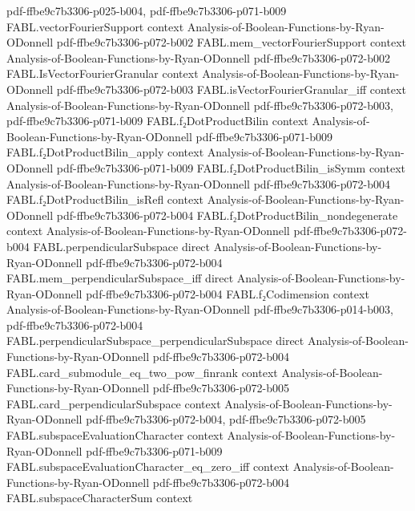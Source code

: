 \begin{theorem}
  {pdf-ffbe9c7b3306-p025-b004,
    pdf-ffbe9c7b3306-p071-b009}
\proofstep
  {FABL.vectorFourierSupport}
  {context}
  {Analysis-of-Boolean-Functions-by-Ryan-ODonnell}
  {pdf-ffbe9c7b3306-p072-b002}
\proofstep
  {FABL.mem_vectorFourierSupport}
  {context}
  {Analysis-of-Boolean-Functions-by-Ryan-ODonnell}
  {pdf-ffbe9c7b3306-p072-b002}
\proofstep
  {FABL.IsVectorFourierGranular}
  {context}
  {Analysis-of-Boolean-Functions-by-Ryan-ODonnell}
  {pdf-ffbe9c7b3306-p072-b003}
\proofstep
  {FABL.isVectorFourierGranular_iff}
  {context}
  {Analysis-of-Boolean-Functions-by-Ryan-ODonnell}
  {pdf-ffbe9c7b3306-p072-b003,
    pdf-ffbe9c7b3306-p071-b009}
\proofstep
  {FABL.f₂DotProductBilin}
  {context}
  {Analysis-of-Boolean-Functions-by-Ryan-ODonnell}
  {pdf-ffbe9c7b3306-p071-b009}
\proofstep
  {FABL.f₂DotProductBilin_apply}
  {context}
  {Analysis-of-Boolean-Functions-by-Ryan-ODonnell}
  {pdf-ffbe9c7b3306-p071-b009}
\proofstep
  {FABL.f₂DotProductBilin_isSymm}
  {context}
  {Analysis-of-Boolean-Functions-by-Ryan-ODonnell}
  {pdf-ffbe9c7b3306-p072-b004}
\proofstep
  {FABL.f₂DotProductBilin_isRefl}
  {context}
  {Analysis-of-Boolean-Functions-by-Ryan-ODonnell}
  {pdf-ffbe9c7b3306-p072-b004}
\proofstep
  {FABL.f₂DotProductBilin_nondegenerate}
  {context}
  {Analysis-of-Boolean-Functions-by-Ryan-ODonnell}
  {pdf-ffbe9c7b3306-p072-b004}
\proofstep
  {FABL.perpendicularSubspace}
  {direct}
  {Analysis-of-Boolean-Functions-by-Ryan-ODonnell}
  {pdf-ffbe9c7b3306-p072-b004}
\proofstep
  {FABL.mem_perpendicularSubspace_iff}
  {direct}
  {Analysis-of-Boolean-Functions-by-Ryan-ODonnell}
  {pdf-ffbe9c7b3306-p072-b004}
\proofstep
  {FABL.f₂Codimension}
  {context}
  {Analysis-of-Boolean-Functions-by-Ryan-ODonnell}
  {pdf-ffbe9c7b3306-p014-b003,
    pdf-ffbe9c7b3306-p072-b004}
\proofstep
  {FABL.perpendicularSubspace_perpendicularSubspace}
  {direct}
  {Analysis-of-Boolean-Functions-by-Ryan-ODonnell}
  {pdf-ffbe9c7b3306-p072-b004}
\proofstep
  {FABL.card_submodule_eq_two_pow_finrank}
  {context}
  {Analysis-of-Boolean-Functions-by-Ryan-ODonnell}
  {pdf-ffbe9c7b3306-p072-b005}
\proofstep
  {FABL.card_perpendicularSubspace}
  {context}
  {Analysis-of-Boolean-Functions-by-Ryan-ODonnell}
  {pdf-ffbe9c7b3306-p072-b004,
    pdf-ffbe9c7b3306-p072-b005}
\proofstep
  {FABL.subspaceEvaluationCharacter}
  {context}
  {Analysis-of-Boolean-Functions-by-Ryan-ODonnell}
  {pdf-ffbe9c7b3306-p071-b009}
\proofstep
  {FABL.subspaceEvaluationCharacter_eq_zero_iff}
  {context}
  {Analysis-of-Boolean-Functions-by-Ryan-ODonnell}
  {pdf-ffbe9c7b3306-p072-b004}
\proofstep
  {FABL.subspaceCharacterSum}
  {context}

\end{theorem}
